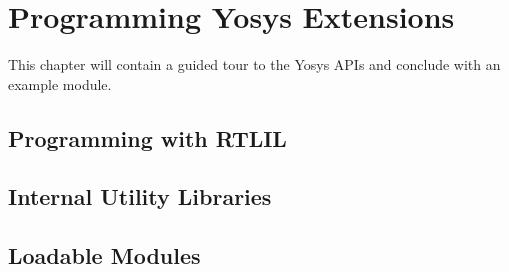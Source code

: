 
\chapter{Programming Yosys Extensions}
\label{chapter:prog}

\begin{fixme}
This chapter will contain a guided tour to the Yosys APIs and conclude
with an example module.
\end{fixme}

\section{Programming with RTLIL}
\section{Internal Utility Libraries}
\section{Loadable Modules}

